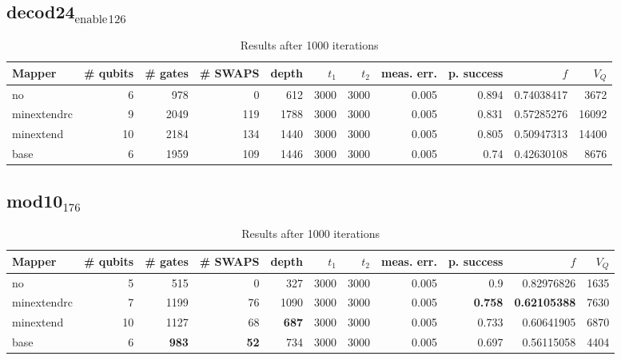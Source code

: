 \documentclass[11pt]{article}
\begin{document}
\subsection{decod24\(_{\text{enable}}\)\(_{\text{126}}\)}
\label{sec:org07b5abf}
\begin{table}[H]
\caption{\label{tab:orgab270bc}
Results after 1000 iterations}
\centering
\small
\begin{tabular}{lrrrrrrrrrr}
\hline
Mapper & \# qubits & \# gates & \# SWAPS & depth & \(t_1\) & \(t_2\) & meas. err. & p. success & \(f\) & \(V_Q\)\\
\hline
no & 6 & 978 & 0 & 612 & 3000 & 3000 & 0.005 & 0.894 & 0.74038417 & 3672\\
\hline
minextendrc & 9 & 2049 & 119 & 1788 & 3000 & 3000 & 0.005 & 0.831 & 0.57285276 & 16092\\
minextend & 10 & 2184 & 134 & 1440 & 3000 & 3000 & 0.005 & 0.805 & 0.50947313 & 14400\\
base & 6 & 1959 & 109 & 1446 & 3000 & 3000 & 0.005 & 0.74 & 0.42630108 & 8676\\
\hline
\end{tabular}
\end{table}

\subsection{mod10\(_{\text{176}}\)}
\label{sec:org97b1c01}
\begin{table}[H]
\caption{\label{tab:orgf4755f2}
Results after 1000 iterations}
\centering
\small
\begin{tabular}{lrrrrrrrrrr}
\hline
Mapper & \# qubits & \# gates & \# SWAPS & depth & \(t_1\) & \(t_2\) & meas. err. & p. success & \(f\) & \(V_Q\)\\
\hline
no & 5 & 515 & 0 & 327 & 3000 & 3000 & 0.005 & 0.9 & 0.82976826 & 1635\\
\hline
minextendrc & 7 & 1199 & 76 & 1090 & 3000 & 3000 & 0.005 & \textbf{0.758} & \textbf{0.62105388} & 7630\\
minextend & 10 & 1127 & 68 & \textbf{687} & 3000 & 3000 & 0.005 & 0.733 & 0.60641905 & 6870\\
base & 6 & \textbf{983} & \textbf{52} & 734 & 3000 & 3000 & 0.005 & 0.697 & 0.56115058 & 4404\\
\hline
\end{tabular}
\end{table}
\end{document}
